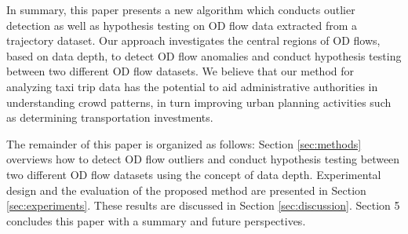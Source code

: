 \documentclass[a4paper,UKenglish]{lipics-v2018}
\begin{document}
In summary, this paper presents a new algorithm which conducts outlier detection as well as hypothesis testing on OD flow data extracted from a trajectory dataset. Our approach investigates the central regions of OD flows, based on data depth, to detect OD flow anomalies and conduct hypothesis testing between two different OD flow datasets. We believe that our method for analyzing taxi trip data has the potential to aid administrative authorities in understanding crowd patterns, in turn improving urban planning activities such as determining transportation investments. 

The remainder of this paper is organized as follows: Section \ref{sec:methods} overviews how to detect OD flow outliers and conduct  hypothesis testing between two different OD flow datasets using the concept of data depth. 
Experimental design and the evaluation of the proposed method are presented in Section \ref{sec:experiments}. 
These results are discussed in Section \ref{sec:discussion}. 
Section 5 concludes this paper with a summary and future perspectives.

%
\end{document}
